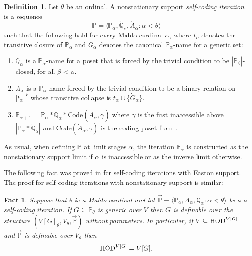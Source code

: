 \documentclass[11pt]{amsart}
\newtheorem{fact}[theorem]{Fact}
\theoremstyle{definition}
\newtheorem{definition}[theorem]{Definition}
\newcounter{condition}
\theoremstyle{remark}
\newcommand\HOD{\textnormal{HOD}}
\newcommand\<{{<}}
\def\s{\subseteq}
\newcommand{\po}{\mathbb{P}}
\begin{document}
\begin{definition}\label{def: selfcoding}    Let $\theta$ be an ordinal. A nonstationary support \emph{self-coding iteration} is a sequence $$\mathbb{P} = \langle \mathbb{P}_\alpha, \dot{\mathbb{Q}}_\alpha,
    \dot{A}_\alpha\colon \alpha<\theta\rangle$$ such that the following hold {for every Mahlo cardinal $\alpha$}, where $t_\alpha$ denotes the transitive closure of $\mathbb{P}_\alpha$ and $G_\alpha$ denotes the canonical $\mathbb P_\alpha$-name for a generic set:
    \begin{enumerate}
        \item $\dot{\mathbb{Q}}_\alpha$ is a $\mathbb{P}_\alpha$-name for a poset that is forced by the trivial condition  to be $|\mathbb{P}_\beta|$-closed, for all $\beta<\alpha.$
        \item $\dot{A}_\alpha$ is a $\mathbb{P}_\alpha$-name forced by
        the trivial condition to be a binary relation on $|t_\alpha|^V$ whose transitive collapse is $t_\alpha\cup\{\dot{G}_\alpha\}.$
        \item $\mathbb{P}_{\alpha+1}=\mathbb{P}_\alpha\ast \dot{\mathbb{Q}}_\alpha\ast {\mathrm{Code}}(\dot{A}_\alpha,\gamma)$ where $\gamma$ is the first inaccessible above $|\mathbb{P}_\alpha\ast \dot{\mathbb{Q}}_\alpha|$ and $\mathrm{Code}(\dot{A}_\alpha,\gamma)$ is the coding poset from \cite[\S2]{GoldbergPoveda}.
        
    \end{enumerate}
    As usual, when defining $\po$ at limit stages $\alpha$, the iteration $\mathbb{P}_\alpha$ is constructed as the nonstationary support limit if $\alpha$ is inaccessible 
        or as the inverse limit otherwise.
\end{definition}
The following fact was proved in {\cite[Lemma 2.21]{GoldbergPoveda}} for self-coding iterations with Easton support. The proof for self-coding iterations with nonstationary support is similar: 
\begin{fact}\label{lemma: self-coding}\label{fact: V=HOD}
    Suppose that $\theta$ is a Mahlo cardinal and let $\vec{\mathbb{P}}=\langle \mathbb{P}_\alpha, \dot{A}_\alpha, \dot{\mathbb{Q}}_\alpha\colon \alpha<\theta\rangle$ be a a self-coding iteration. If $G\s \mathbb{P}_\theta$ is generic over $V$ then $G$ is definable over the structure $(V[G]_\theta, V_\theta, \vec{\mathbb{P}})$ without parameters.  In particular, if $V\s \HOD^{V[G]}$ and $\vec{\mathbb{P}}$ is definable over $V_\theta$ then $$\HOD^{V[G]}=V[G].$$
\end{fact}
\end{document}
